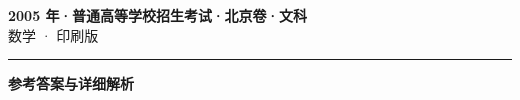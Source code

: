 \documentclass[zihao=5, a4paper]{ctexart}
\begin{document}
\begin{center}
  {\Large\bfseries 2005 年·普通高等学校招生考试·北京卷·文科}\\[4pt]
  {\large 数学 · 印刷版}
\end{center}
\medskip
{}

\par\bigskip\hrule\bigskip
{}
\begin{center}{\large\bfseries 参考答案与详细解析}\end{center}
\smallskip

\end{document}
